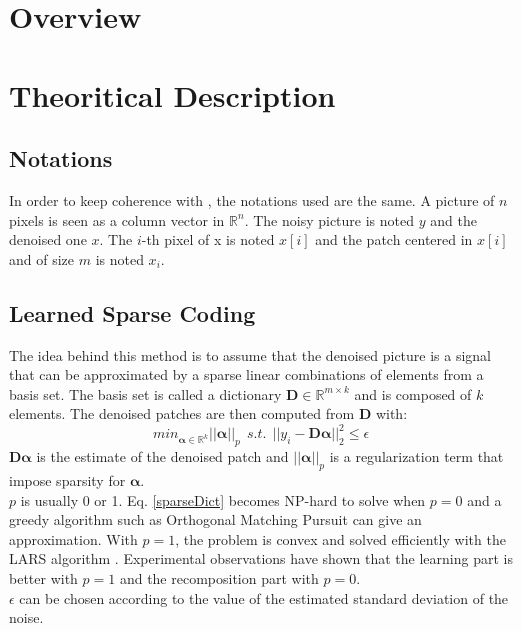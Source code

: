\documentclass{ipol}
\newcommand{\psize}{m}
\newcommand{\dsize}{k}
\newcommand{\dict}{\textbf{D}}
\newcommand{\code}{\bm{\alpha}}
\newcommand{\pnorm}{p}
\newcommand{\denoi}{x}
\newcommand{\noi}{y}
\newcommand{\RR}{\mathbb{R}}
\newcommand{\Rn}{\mathbb{R}^n}
\begin{document}
\begin{abstract}

\end{abstract} 

\section{Overview}


\section{Theoritical Description}

\subsection{ Notations}

In order to keep coherence with \cite{LSSC}, the notations used are the same.
A picture of $n$ pixels is seen as a column vector in $\Rn$. The noisy picture is noted $\noi$ and the denoised one $\denoi$. The $i$-th pixel of x is noted $\denoi[i]$ and the patch centered in $\denoi[i]$ and of size $\psize$ is noted $\denoi_i$.

\subsection{ Learned Sparse Coding}

The idea behind this method is to assume that the denoised picture is a signal that can be approximated by a sparse linear combinations of elements from a basis set. The basis set is called a dictionary $\dict \in \RR^{\psize \times \dsize}$ and is composed of $\dsize$ elements. The denoised patches are then computed from $\dict$ with:\\
\begin{equation}
	min_{\code\in \RR^\dsize} ||\code||_\pnorm \ \ s.t. \ \ ||\noi_i  - \dict \code||^2_2 \leqslant \epsilon
	\label{sparseDict}
\end{equation}
$\dict \code$ is the estimate of the denoised patch and $||\code||_\pnorm $ is a regularization term that impose sparsity for $\code$.\\ 
$\pnorm$ is usually 0 or 1. Eq. \ref{sparseDict} becomes NP-hard to solve when $\pnorm=0$ and a greedy algorithm such as Orthogonal Matching Pursuit \cite{OMP} can give an approximation. With $\pnorm=1$, the problem is convex and solved efficiently with the LARS algorithm \cite{LARS}. Experimental observations \cite{l0l1} have shown that the learning part is better with $\pnorm=1$ and the recomposition part with $\pnorm=0$.\\
 $\epsilon$ can be chosen according to the value of the estimated standard deviation of the noise.
\end{document}
